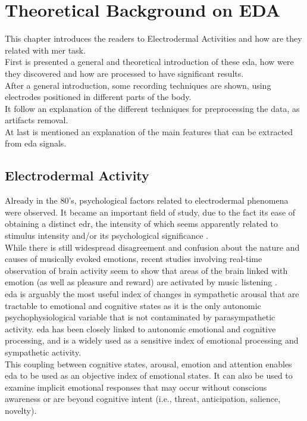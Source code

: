 \chapter{Theoretical Background on EDA}
\label{chap:TheoreticalBackgroundEDA}
\pagestyle{plain}
\vspace{0.5cm}

\noindent This chapter introduces the readers to Electrodermal Activities and how are they related with \gls{mer} task.
\\ \indent
First is presented a general and theoretical introduction of these \gls{eda}, how were they discovered and how are processed to have significant results.
\\ \indent
After a general introduction, some recording techniques are shown, using electrodes positioned in different parts of the body.
\\ \indent
It follow an explanation of the different techniques for preprocessing the data, as artifacts removal.
\\ \indent
At last is mentioned an explanation of the main features that can be extracted from \gls{eda} signals.

\section{Electrodermal Activity}
Already in the 80's, psychological factors related to electrodermal phenomena were observed. It became an important field of study, due to the fact its ease of obtaining a distinct \gls{edr}, the intensity of which seems apparently related to stimulus intensity and/or its psychological significance \cite{boucsein2012electrodermal}.
\\ \indent
While there is still widespread disagreement and confusion about the nature and causes of musically evoked emotions, recent studies involving real-time observation of brain activity seem to show that areas of the brain linked with emotion (as well as pleasure and reward) are activated by music listening \cite{trost2012mapping}.
\\ \indent
\gls{eda} is arguably the most useful index of changes in sympathetic arousal that are tractable to emotional and cognitive states as it is the only autonomic psychophysiological variable that is not contaminated by parasympathetic activity. \gls{eda} has been closely linked to autonomic emotional and cognitive processing, and is a widely used as a sensitive index of emotional processing and sympathetic activity.
\\
This coupling between cognitive states, arousal, emotion and attention enables \gls{eda}  to be used as an objective index of emotional states. It can also be used to examine implicit emotional responses that may occur without conscious awareness or are beyond cognitive intent (i.e., threat, anticipation, salience, novelty).

